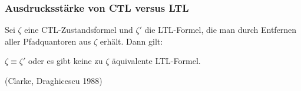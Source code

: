 \begin{frame}
  \frametitle{Ausdrucksstärke von CTL versus LTL}
  
  \begin{lemma}
    Sei $\zeta$ eine CTL-Zustandsformel und $\zeta'$ die LTL-Formel,
    die man durch Entfernen aller Pfadquantoren aus $\zeta$ erhält.
    Dann gilt:
    \begin{center}
      $\zeta \equiv \zeta'$ oder es gibt keine zu $\zeta$ äquivalente LTL-Formel.
    \end{center}
    \par\vspace*{-.4\baselineskip}
    \label{lem:aequiv_LTL_Fmln}
  \end{lemma}

  \par
   (Clarke, Draghicescu 1988)
  
  \parII
  
  \parI

  \parI
  
\end{frame}

